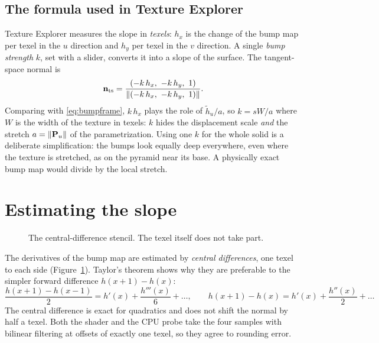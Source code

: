 \subsection{The formula used in Texture Explorer}
\label{sec:bumpformula}
Texture Explorer measures the slope in \emph{texels}: $h_x$ is the change of the bump map per
texel in the $u$ direction and $h_y$ per texel in the $v$ direction. A single \emph{bump
strength} $k$, set with a slider, converts it into a slope of the surface. The tangent-space
normal is
\begin{equation}
  \label{eq:nts}
  \nts = \frac{(-k\,h_x,\ -k\,h_y,\ 1)}{\lVert(-k\,h_x,\ -k\,h_y,\ 1)\rVert}.
\end{equation}
Comparing with \eqref{eq:bumpframe}, $k\,h_x$ plays the role of $\tilde h_u/a$, so
$k = sW/a$ where $W$ is the width of the texture in texels: $k$ hides the displacement scale
\emph{and} the stretch $a=\lVert\mathbf{P}_u\rVert$ of the parametrization. Using one $k$ for the
whole solid is a deliberate simplification: the bumps look equally deep everywhere, even where
the texture is stretched, as on the pyramid near its base. A physically exact bump map would
divide by the local stretch.

\section{Estimating the slope}
\label{sec:centraldiff}

\begin{figure}[ht]
\centering
{}
\caption{The central-difference stencil. The texel itself does not take part.}
\label{fig:stencil}
\end{figure}

The derivatives of the bump map are estimated by \emph{central differences}, one texel to each
side (Figure~\ref{fig:stencil}). Taylor's theorem shows why they are preferable to the simpler
forward difference $h(x+1)-h(x)$:
\[
  \frac{h(x+1)-h(x-1)}{2} = h'(x) + \frac{h'''(x)}{6} + \dots,\qquad
  h(x+1)-h(x) = h'(x) + \frac{h''(x)}{2} + \dots
\]
The central difference is exact for quadratics and does not shift the normal by half a texel.
Both the shader and the CPU probe take the four samples with bilinear filtering at offsets of
exactly one texel, so they agree to rounding error.

